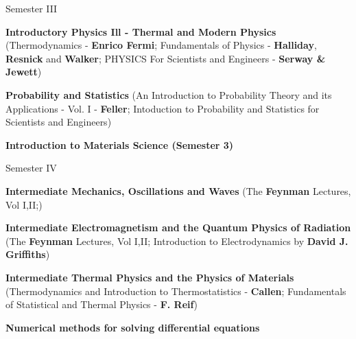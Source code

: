 \begin{cventries}
  \cventry
    {Semester III} %
    {} %
    {} %
    {} %
    {
      \begin{cvitems} %
        \item {\textbf{Introductory Physics Ill - Thermal and Modern Physics} (Thermodynamics - \textbf{Enrico Fermi}; Fundamentals of Physics - \textbf{Halliday}, \textbf{Resnick} and \textbf{Walker}; PHYSICS For Scientists and Engineers - \textbf{Serway \& Jewett})}
        \item {\textbf{Probability and Statistics} (An Introduction to Probability Theory and its Applications - Vol. I - \textbf{Feller}; Intoduction to Probability and Statistics for Scientists and Engineers)}
        \item{\textbf{Introduction to Materials Science (Semester 3)}}
      \end{cvitems}
    }

  \cventry
    {Semester IV} %
    {} %
    {} %
    {} %
    {
      \begin{cvitems} %
        \item {\textbf{Intermediate Mechanics, Oscillations and Waves} (The \textbf{Feynman} Lectures, Vol I,II;)}
        \item {\textbf{Intermediate Electromagnetism and the Quantum Physics of Radiation} (The \textbf{Feynman} Lectures, Vol I,II; Introduction to Electrodynamics by \textbf{David J. Griffiths}) }
        \item{\textbf{Intermediate Thermal Physics and the Physics of Materials} (Thermodynamics and Introduction to Thermostatistics - \textbf{Callen}; Fundamentals of Statistical and Thermal Physics - \textbf{F. Reif})}
        \item {\textbf{Numerical methods for solving differential equations}}
      \end{cvitems}
    }


\end{cventries}
